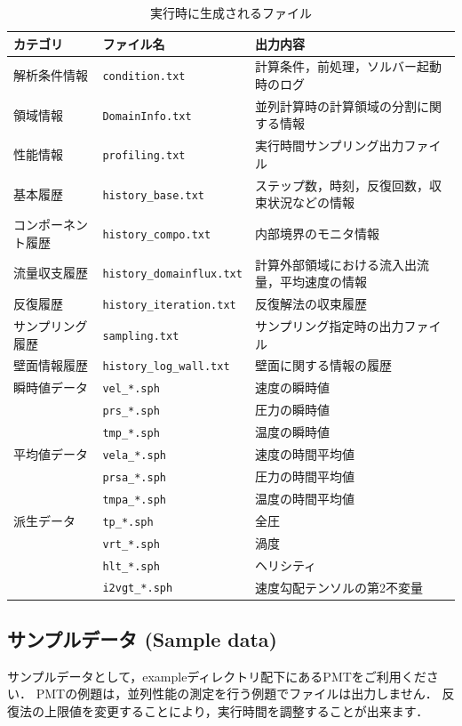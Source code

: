 \documentclass[a4paper,10pt,oneside,fleqn]{jsarticle}
\begin{document}
\begin{table}[htdp]
\caption{実行時に生成されるファイル}
\begin{center}
\small
\begin{tabular}{lll}\toprule
カテゴリ & ファイル名 & 出力内容\\ \midrule
解析条件情報 & \verb|condition.txt| & 計算条件，前処理，ソルバー起動時のログ\\
領域情報 & \verb|DomainInfo.txt| & 並列計算時の計算領域の分割に関する情報\\ 
性能情報 & \verb|profiling.txt| & 実行時間サンプリング出力ファイル\\ \hline
基本履歴 & \verb|history_base.txt| & ステップ数，時刻，反復回数，収束状況などの情報\\
コンポーネント履歴 & \verb|history_compo.txt| & 内部境界のモニタ情報\\
流量収支履歴 & \verb|history_domainflux.txt| & 計算外部領域における流入出流量，平均速度の情報\\
反復履歴 & \verb|history_iteration.txt| & 反復解法の収束履歴\\ 
サンプリング履歴 & \verb|sampling.txt| & サンプリング指定時の出力ファイル\\ 
壁面情報履歴 & \verb|history_log_wall.txt| & 壁面に関する情報の履歴\\ \hline
瞬時値データ & \verb|vel_*.sph| & 速度の瞬時値\\
& \verb|prs_*.sph| & 圧力の瞬時値\\
& \verb|tmp_*.sph| & 温度の瞬時値\\
平均値データ & \verb|vela_*.sph| & 速度の時間平均値\\
& \verb|prsa_*.sph| & 圧力の時間平均値\\
& \verb|tmpa_*.sph| & 温度の時間平均値\\
派生データ & \verb|tp_*.sph| & 全圧\\
& \verb|vrt_*.sph| & 渦度\\
& \verb|hlt_*.sph| & ヘリシティ\\
& \verb|i2vgt_*.sph| & 速度勾配テンソルの第2不変量\\ 
\bottomrule
\end{tabular}
\end{center}
\label{tbl:logfiles}
\end{table}

   

%
\subsection{サンプルデータ (Sample data)}
サンプルデータとして，exampleディレクトリ配下にあるPMTをご利用ください．
PMTの例題は，並列性能の測定を行う例題でファイルは出力しません．
反復法の上限値を変更することにより，実行時間を調整することが出来ます．
   
\end{document}
